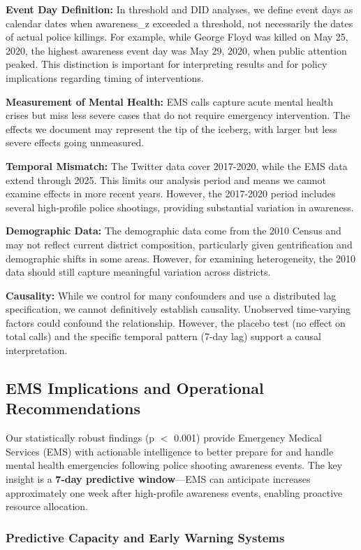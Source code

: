 \documentclass[11pt,a4paper]{article}
\begin{document}
\textbf{Event Day Definition:} In threshold and DID analyses, we define event days as calendar dates when awareness_z exceeded a threshold, not necessarily the dates of actual police killings. For example, while George Floyd was killed on May 25, 2020, the highest awareness event day was May 29, 2020, when public attention peaked. This distinction is important for interpreting results and for policy implications regarding timing of interventions.

\textbf{Measurement of Mental Health:} EMS calls capture acute mental health crises but miss less severe cases that do not require emergency intervention. The effects we document may represent the tip of the iceberg, with larger but less severe effects going unmeasured.

\textbf{Temporal Mismatch:} The Twitter data cover 2017-2020, while the EMS data extend through 2025. This limits our analysis period and means we cannot examine effects in more recent years. However, the 2017-2020 period includes several high-profile police shootings, providing substantial variation in awareness.

\textbf{Demographic Data:} The demographic data come from the 2010 Census and may not reflect current district composition, particularly given gentrification and demographic shifts in some areas. However, for examining heterogeneity, the 2010 data should still capture meaningful variation across districts.

\textbf{Causality:} While we control for many confounders and use a distributed lag specification, we cannot definitively establish causality. Unobserved time-varying factors could confound the relationship. However, the placebo test (no effect on total calls) and the specific temporal pattern (7-day lag) support a causal interpretation.

\subsection{EMS Implications and Operational Recommendations}

Our statistically robust findings (p $<$ 0.001) provide Emergency Medical Services (EMS) with actionable intelligence to better prepare for and handle mental health emergencies following police shooting awareness events. The key insight is a \textbf{7-day predictive window}—EMS can anticipate increases approximately one week after high-profile awareness events, enabling proactive resource allocation.

\subsubsection{Predictive Capacity and Early Warning Systems}
\end{document}
